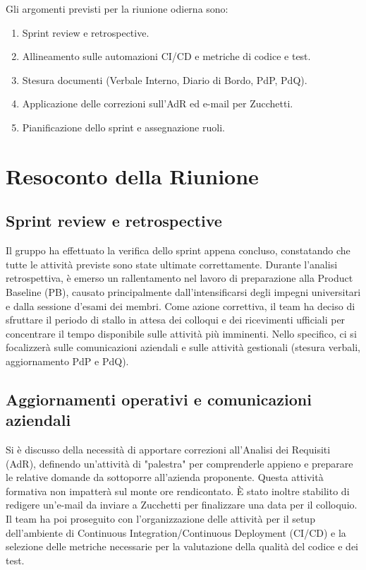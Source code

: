 Gli argomenti previsti per la riunione odierna sono:

\begin{enumerate}
	\item Sprint review e retrospective.
	\item Allineamento sulle automazioni CI/CD e metriche di codice e test.
	\item Stesura documenti (Verbale Interno, Diario di Bordo, PdP, PdQ).
	\item Applicazione delle correzioni sull'AdR ed e-mail per Zucchetti.
	\item Pianificazione dello sprint e assegnazione ruoli.
\end{enumerate}


\section{Resoconto della Riunione}

\subsection{Sprint review e retrospective}
Il gruppo ha effettuato la verifica dello sprint appena concluso, constatando che tutte le attività previste sono state ultimate correttamente. Durante l'analisi retrospettiva, è emerso un rallentamento nel lavoro di preparazione alla Product Baseline (PB), causato principalmente dall'intensificarsi degli impegni universitari e dalla sessione d'esami dei membri. Come azione correttiva, il team ha deciso di sfruttare il periodo di stallo in attesa dei colloqui e dei ricevimenti ufficiali per concentrare il tempo disponibile sulle attività più imminenti. Nello specifico, ci si focalizzerà sulle comunicazioni aziendali e sulle attività gestionali (stesura verbali, aggiornamento PdP e PdQ).

\subsection{Aggiornamenti operativi e comunicazioni aziendali}
Si è discusso della necessità di apportare correzioni all'Analisi dei Requisiti (AdR), definendo un'attività di "palestra" per comprenderle appieno e preparare le relative domande da sottoporre all'azienda proponente. Questa attività formativa non impatterà sul monte ore rendicontato. È stato inoltre stabilito di redigere un'e-mail da inviare a Zucchetti per finalizzare una data per il colloquio. Il team ha poi proseguito con l'organizzazione delle attività per il setup dell'ambiente di Continuous Integration/Continuous Deployment (CI/CD) e la selezione delle metriche necessarie per la valutazione della qualità del codice e dei test. 

